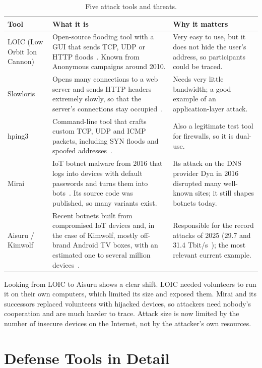 \begin{table}[ht]
	\centering
	\small
	\begin{tabularx}{\textwidth}{@{}l>{\raggedright\arraybackslash}X>{\raggedright\arraybackslash}X@{}}
		\toprule
		Tool & What it is & Why it matters \\
		\midrule
		LOIC (Low Orbit Ion Cannon) & Open-source flooding tool with a GUI that sends TCP, UDP or HTTP floods~\cite{loic}. Known from Anonymous campaigns around 2010. & Very easy to use, but it does not hide the user's address, so participants could be traced. \\
		Slowloris & Opens many connections to a web server and sends HTTP headers extremely slowly, so that the server's connections stay occupied~\cite{slowloris}. & Needs very little bandwidth; a good example of an application-layer attack. \\
		hping3 & Command-line tool that crafts custom TCP, UDP and ICMP packets, including SYN floods and spoofed addresses~\cite{hping}. & Also a legitimate test tool for firewalls, so it is dual-use. \\
		Mirai & IoT botnet malware from 2016 that logs into devices with default passwords and turns them into bots~\cite{mirai}. Its source code was published, so many variants exist. & Its attack on the DNS provider Dyn in 2016 disrupted many well-known sites; it still shapes botnets today. \\
		Aisuru / Kimwolf & Recent botnets built from compromised IoT devices and, in the case of Kimwolf, mostly off-brand Android TV boxes, with an estimated one to several million devices~\cite{thn_aisuru,cyberinsider}. & Responsible for the record attacks of 2025 (29.7 and 31.4 Tbit/s~\cite{cf_q3,thn_aisuru}); the most relevant current example. \\
		\bottomrule
	\end{tabularx}
	\caption{Five attack tools and threats.}
	\label{tab:tools}
\end{table}

Looking from LOIC to Aisuru shows a clear shift. LOIC needed volunteers to run it on their own computers, which limited its size and exposed them. Mirai and its successors replaced volunteers with hijacked devices, so attackers need nobody's cooperation and are much harder to trace. Attack size is now limited by the number of insecure devices on the Internet, not by the attacker's own resources.

\section{Defense Tools in Detail}\label{sec:defense}

